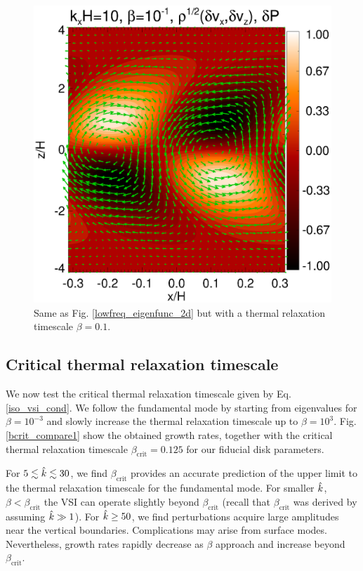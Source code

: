 \begin{figure}
  \includegraphics[width=\linewidth]{figures/result2d_cool}
  \caption{Same as  Fig. \ref{lowfreq_eigenfunc_2d} but with a thermal
    relaxation timescale $\beta=0.1$. 
    \label{lowfreq_eigenfunc_2d_cool}
  }
\end{figure}

\subsection{Critical thermal relaxation
  timescale}\label{bcrit_num_test}
We now test the critical thermal relaxation timescale given by
Eq. \ref{iso_vsi_cond}. We follow the fundamental mode by starting
from eigenvalues for $\beta=10^{-3}$ and slowly increase the thermal
relaxation timescale up to $\beta=10^3$. Fig. \ref{bcrit_compare1}
show the obtained growth rates, together with the critical 
thermal relaxation timescale $\beta_\mathrm{crit}=0.125$ for our
fiducial disk parameters.   

For $5\lesssim\hat{k}\lesssim30$, we find $\beta_\mathrm{crit}$ provides
an accurate prediction of the upper limit to the thermal relaxation 
timescale for the fundamental mode. For smaller $\hat{k}$, 
$\beta<\beta_\mathrm{crit}$ the VSI can operate slightly beyond
$\beta_\mathrm{crit}$ (recall that $\beta_\mathrm{crit}$ was derived
by assuming $\hat{k}\gg 1$). For $\hat{k}\geq 50$, we find perturbations
acquire large amplitudes near the vertical boundaries. Complications
may arise from surface modes. Nevertheless, growth rates rapidly
decrease as $\beta$ approach and increase beyond
$\beta_\mathrm{crit}$.  

